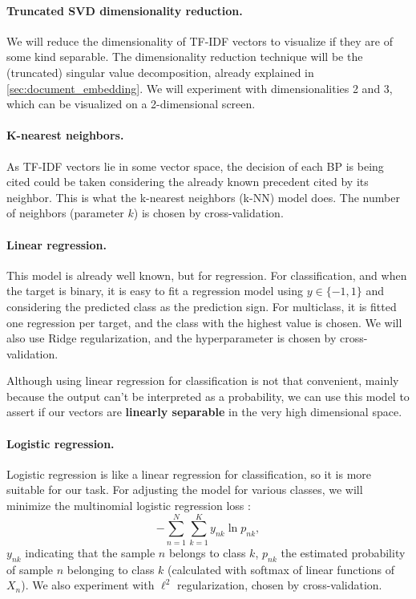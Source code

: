     \paragraph{Truncated SVD dimensionality reduction.} We will reduce the dimensionality of TF-IDF vectors to visualize if they are of some kind separable. The dimensionality reduction technique will be the (truncated) singular value decomposition, already explained in \autoref{sec:document_embedding}. We will experiment with dimensionalities 2 and 3, which can be visualized on a 2-dimensional screen.

    \paragraph{K-nearest neighbors.} As TF-IDF vectors lie in some vector space, the decision of each BP is being cited could be taken considering the already known precedent cited by its neighbor. This is what the k-nearest neighbors (k-NN) model does. The number of neighbors (parameter $k$) is chosen by cross-validation.

    \paragraph{Linear regression.} This model is already well known, but for regression. For classification, and when the target is binary, it is easy to fit a regression model using $y \in \{-1, 1\}$ and considering the predicted class as the prediction sign. For multiclass, it is fitted one regression per target, and the class with the highest value is chosen. We will also use Ridge regularization, and the hyperparameter is chosen by cross-validation.

    Although using linear regression for classification is not that convenient, mainly because the output can't be interpreted as a probability, we can use this model to assert if our vectors are \textbf{linearly separable} in the very high dimensional space.

    \paragraph{Logistic regression.} Logistic regression is like a linear regression for classification, so it is more suitable for our task. For adjusting the model for various classes, we will minimize the multinomial logistic regression loss \cite{bishop2006pattern}:
    \[- \sum_{n=1}^N \sum_{k=1}^K y_{nk} \ln p_{nk},\]                  
    $y_{nk}$ indicating that the sample $n$ belongs to class $k$, $p_{nk}$ the estimated probability of sample $n$ belonging to class $k$ (calculated with softmax of linear functions of $X_n$). We also experiment with $\ell^2$ regularization, chosen by cross-validation.

